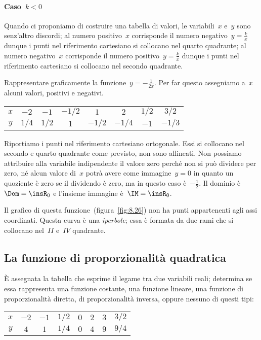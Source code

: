 \paragraph{Caso~$k<0$} Quando ci proponiamo di costruire una tabella di valori, le variabili~$x$ e~$y$ sono senz'altro discordi;
al numero positivo~$x$ corrisponde il numero negativo~$y=\frac{k}{x}$ dunque i punti nel riferimento cartesiano si
collocano nel quarto quadrante; al numero negativo~$x$ corrisponde il numero positivo~$y=\frac{k}{x}$ dunque i
punti nel riferimento cartesiano si collocano nel secondo quadrante.
\begin{exrig}
 \begin{esempio}
Rappresentare graficamente la funzione~$y=-\frac{1}{2x}$.
Per far questo assegniamo a~$x$ alcuni valori, positivi e negativi.
\begin{center}
 \begin{tabular}{cccccccc}
 \toprule
 $x$ & $-2$ & $-1$ & $-1/2$ & $1$ & $2$& $1/2$ & $3/2$\\
 $y$ & $1/4$ & $1/2$ & $1$ & $-1/2$ & $-1/4$& $-1$ & $-1/3$\\
 \bottomrule
 \end{tabular}
\end{center}
Riportiamo i punti nel riferimento cartesiano ortogonale. Essi si collocano nel secondo e quarto quadrante come previsto,
non sono allineati. Non possiamo attribuire alla variabile indipendente il valore zero perché non si può dividere per zero,
né alcun valore di~$x$ potrà avere come immagine~$y=0$ in quanto un quoziente è zero se il dividendo è zero, ma
in questo caso è~$-\frac{1}{2}$.
Il dominio è~$\Dom=\insR_{0}$ e l'insieme immagine è~$\IM=\insR_{0}$. 

Il grafico di questa funzione~(figura~\ref{fig:8.26}) non ha punti appartenenti agli assi coordinati.
Questa curva è una \emph{iperbole}; essa è formata da due rami che si collocano nel~$II$ e~$IV$ quadrante.
 \end{esempio}
\end{exrig}

\ovalbox{\risolvii \ref{ese:8.53}, \ref{ese:8.54}}

\subsection{La funzione di proporzionalità quadratica}
È assegnata la tabella che esprime il legame tra due variabili reali; determina se essa rappresenta una funzione costante,
una funzione lineare, una funzione di proporzionalità diretta, di proporzionalità inversa, oppure nessuno di questi tipi:
\begin{center}
 \begin{tabular}{cccccccc}
 \toprule
 $x$ & $-2$ & $-1$ & $1/2$ & $0$ & $2$& $3$ & $3/2$\\
 $y$ & $4$ & $1$ & $1/4$ & $0$ & $4$& $9$ & $9/4$\\
 \bottomrule
 \end{tabular}
\end{center}

